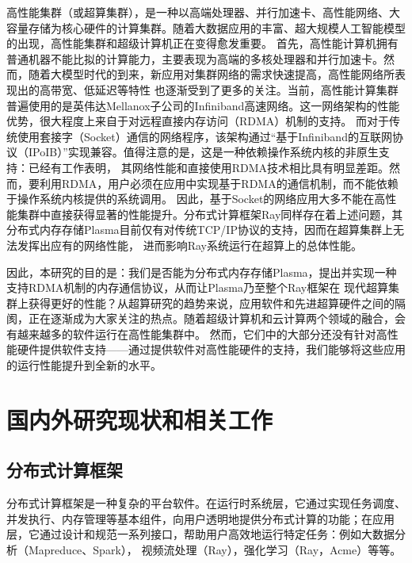 高性能集群（或超算集群），是一种以高端处理器、并行加速卡、高性能网络、大容量存储为核心硬件的计算集群。随着大数据应用的丰富、超大规模人工智能模型的出现，高性能集群和超级计算机正在变得愈发重要。
首先，高性能计算机拥有普通机器不能比拟的计算能力，主要表现为高端的多核处理器和并行加速卡。然而，随着大模型时代的到来，新应用对集群网络的需求快速提高，高性能网络所表现出的高带宽、低延迟等特性
也逐渐受到了更多的关注。当前，高性能计算集群普遍使用的是英伟达Mellanox子公司的Infiniband高速网络\cite{pfister2001introduction}。这一网络架构的性能优势，很大程度上来自于对远程直接内存访问（RDMA）机制的支持。
而对于传统使用套接字（Socket）通信的网络程序，该架构通过“基于Infiniband的互联网协议（IPoIB）”实现兼容。值得注意的是，这是一种依赖操作系统内核的非原生支持：已经有工作\cite{mitchell2013using}表明，
其网络性能和直接使用RDMA技术相比具有明显差距。然而，要利用RDMA，用户必须在应用中实现基于RDMA的通信机制，而不能依赖于操作系统内核提供的系统调用。
因此，基于Socket的网络应用大多不能在高性能集群中直接获得显著的性能提升。分布式计算框架Ray同样存在着上述问题，其分布式内存存储Plasma目前仅有对传统TCP/IP协议的支持，因而在超算集群上无法发挥出应有的网络性能，
进而影响Ray系统运行在超算上的总体性能。

因此，本研究的目的是：我们是否能为分布式内存存储Plasma，提出并实现一种支持RDMA机制的内存通信协议，从而让Plasma乃至整个Ray框架在
现代超算集群上获得更好的性能？从超算研究的趋势来说，应用软件和先进超算硬件之间的隔阂，正在逐渐成为大家关注的热点。随着超级计算机和云计算两个领域的融合，会有越来越多的软件运行在高性能集群中。
然而，它们中的大部分还没有针对高性能硬件提供软件支持——通过提供软件对高性能硬件的支持，我们能够将这些应用的运行性能提升到全新的水平。

\section{国内外研究现状和相关工作}
\label{sec:related_work}

\subsection{分布式计算框架}

分布式计算框架是一种复杂的平台软件。在运行时系统层，它通过实现任务调度、并发执行、内存管理等基本组件，向用户透明地提供分布式计算的功能；在应用层，它通过设计和规范一系列接口，帮助用户高效地运行特定任务：例如大数据分析（Mapreduce、Spark），
视频流处理（Ray），强化学习（Ray，Acme）等等。

